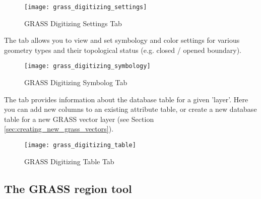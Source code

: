 \begin{figure}[h]
 \begin{center}
 \caption{GRASS Digitizing Settings Tab \nixcaption}\label{fig:grass_digitizing_settings}
 \texttt{[image: grass\_digitizing\_settings]}
 \end{center}
\end{figure}


The  tab allows you to view and set symbology and color
settings for various geometry types and their topological status (e.g. closed
/ opened boundary).

\begin{figure}[h]
 \begin{center}
 \caption{GRASS Digitizing Symbolog Tab \nixcaption}\label{fig:grass_digitizing_symbology}
 \texttt{[image: grass\_digitizing\_symbology]}
 \end{center}
\end{figure}

 

The  tab provides information about the database table for
a given 'layer'. Here you can add new columns to an existing attribute table,
or create a new database table for a new GRASS vector layer (see Section 
\ref{sec:creating_new_grass_vectors}).

\begin{figure}[h]
 \begin{center}
 \caption{GRASS Digitizing Table Tab \nixcaption}\label{fig:grass_digitizing_table}
 \texttt{[image: grass\_digitizing\_table]}
 \end{center}
\end{figure}

\begin{Tip}\caption{\textsc{GRASS Edit Permissions}}
\end{Tip} 

\subsection{The GRASS region tool}\label{sec:grass_region}

